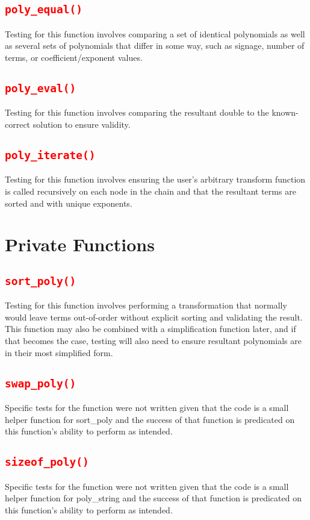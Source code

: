 \documentclass[11pt]{report}
\begin{document}
\subsection*{\texttt{\textcolor{red}{poly\_equal()}}}
Testing for this function involves comparing a set of identical polynomials as well as several sets of polynomials that differ in some way, such as signage, number of terms, or coefficient/exponent values.
\subsection*{\texttt{\textcolor{red}{poly\_eval()}}}
Testing for this function involves comparing the resultant double to the known-correct solution to ensure validity.
\subsection*{\texttt{\textcolor{red}{poly\_iterate()}}}
Testing for this function involves ensuring the user's arbitrary transform function is called recursively on each node in the chain and that the resultant terms are sorted and with unique exponents.
\pagebreak
\section*{Private Functions}
\subsection*{\texttt{\textcolor{red}{sort\_poly()}}}
Testing for this function involves performing a transformation that normally would leave terms out-of-order without explicit sorting and validating the result. This function may also be combined with a simplification function later, and if that becomes the case, testing will also need to ensure resultant polynomials are in their most simplified form.
\subsection*{\texttt{\textcolor{red}{swap\_poly()}}}
Specific tests for the function were not written given that the code is a small helper function for sort\_poly and the success of that function is predicated on this function's ability to perform as intended.
\subsection*{\texttt{\textcolor{red}{sizeof\_poly()}}}
Specific tests for the function were not written given that the code is a small helper function for poly\_string and the success of that function is predicated on this function's ability to perform as intended.
\pagebreak
\end{document}

